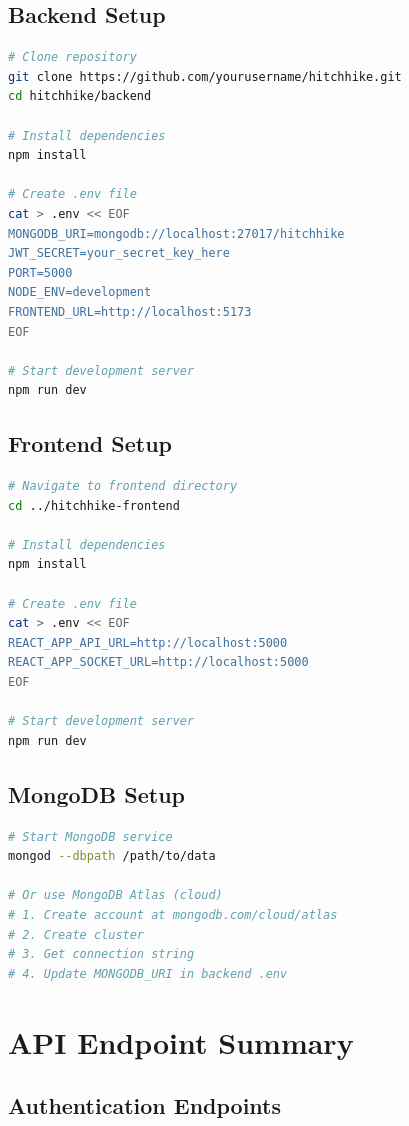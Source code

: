 \documentclass[12pt,a4paper]{article}
\begin{document}
\subsection{Backend Setup}

\begin{lstlisting}[language=bash]
# Clone repository
git clone https://github.com/yourusername/hitchhike.git
cd hitchhike/backend

# Install dependencies
npm install

# Create .env file
cat > .env << EOF
MONGODB_URI=mongodb://localhost:27017/hitchhike
JWT_SECRET=your_secret_key_here
PORT=5000
NODE_ENV=development
FRONTEND_URL=http://localhost:5173
EOF

# Start development server
npm run dev
\end{lstlisting}

\subsection{Frontend Setup}

\begin{lstlisting}[language=bash]
# Navigate to frontend directory
cd ../hitchhike-frontend

# Install dependencies
npm install

# Create .env file
cat > .env << EOF
REACT_APP_API_URL=http://localhost:5000
REACT_APP_SOCKET_URL=http://localhost:5000
EOF

# Start development server
npm run dev
\end{lstlisting}

\subsection{MongoDB Setup}

\begin{lstlisting}[language=bash]
# Start MongoDB service
mongod --dbpath /path/to/data

# Or use MongoDB Atlas (cloud)
# 1. Create account at mongodb.com/cloud/atlas
# 2. Create cluster
# 3. Get connection string
# 4. Update MONGODB_URI in backend .env
\end{lstlisting}

\section{API Endpoint Summary}

\subsection{Authentication Endpoints}
\end{document}

